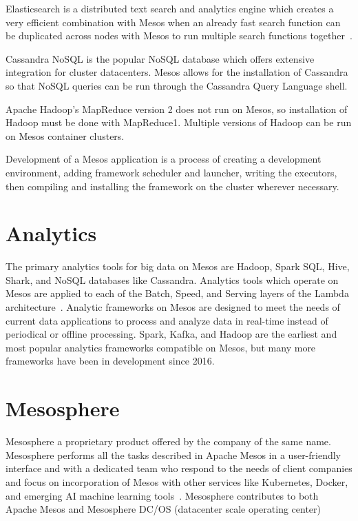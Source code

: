 Elasticsearch is a distributed text search and analytics engine which creates a very efficient combination with Mesos when an already fast search function can be duplicated across nodes with Mesos to run multiple search functions together~\cite{Vanderzyden2015}. 

Cassandra NoSQL is the popular NoSQL database which offers extensive integration for cluster datacenters.  Mesos allows for the installation of Cassandra so that NoSQL queries can be run through the Cassandra Query Language shell. 

Apache Hadoop's MapReduce version 2 does not run on Mesos, so installation of Hadoop must be done with MapReduce1. Multiple versions of Hadoop can be run on Mesos container clusters. 

Development of a Mesos application is a process of creating a development environment, adding framework scheduler and launcher, writing the executors, then compiling and installing the framework on the cluster wherever necessary.  

\section{Analytics}

The primary analytics tools for big data on Mesos are Hadoop, Spark SQL, Hive, Shark, and NoSQL databases like Cassandra. Analytics tools which operate on Mesos are applied to each of the Batch, Speed, and Serving layers of the Lambda architecture~\cite{Kakadia2015}. Analytic frameworks on Mesos are designed to meet the needs of current data applications to process and analyze data in real-time instead of periodical or offline processing. Spark, Kafka, and Hadoop are the earliest and most popular analytics frameworks compatible on Mesos, but many more frameworks have been in development since 2016. 

\section{Mesosphere}

Mesosphere a proprietary product offered by the company of the same name. Mesosphere performs all the tasks described in Apache Mesos in a user-friendly interface and with a dedicated team who respond to the needs of client companies and focus on incorporation of Mesos with other services like Kubernetes, Docker, and emerging AI machine learning tools~\cite{Mae2018}. Mesosphere contributes to both Apache Mesos and Mesosphere DC/OS (datacenter scale operating center)

